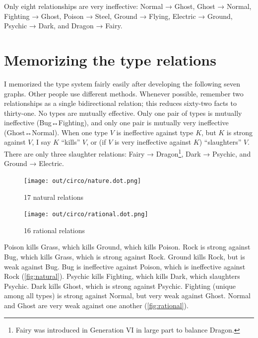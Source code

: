Only eight relationships are very ineffective:
Normal → Ghost,
Ghost → Normal,
Fighting → Ghost,
Poison → Steel,
Ground → Flying,
Electric → Ground,
Psychic → Dark,
and Dragon → Fairy.

\section{Memorizing the type relations}
I memorized the type system fairly easily after developing the following seven graphs.
Other people use different methods.
Whenever possible, remember two relationships as a single bidirectional relation;
  this reduces sixty-two facts to thirty-one.
No types are mutually effective.
Only one pair of types is mutually ineffective (Bug↔Fighting),
  and only one pair is mutually very ineffective (Ghost↔Normal).
When one type $V$ is ineffective against type $K$, but $K$ is strong
 against $V$, I say $K$ ``kills'' $V$, or
 (if $V$ is very ineffective against $K$) ``slaughters'' $V$.
There are only three slaughter relations: Fairy → Dragon\footnote{Fairy was
  introduced in Generation VI in large part to balance Dragon.}, Dark → Psychic,
  and Ground → Electric.

\begin{figure}[h!]
  \begin{minipage}[t]{0.5\textwidth}
    \begin{center}
    \texttt{[image: out/circo/nature.dot.png]}
    \end{center}
    \caption{17 natural relations\label{fig:natural}}
  \end{minipage}
  \begin{minipage}[t]{0.5\textwidth}
    \begin{center}
    \texttt{[image: out/circo/rational.dot.png]}
    \end{center}
    \caption{16 rational relations\label{fig:rational}}
  \end{minipage}
\end{figure}
\noindent{}Poison kills Grass, which kills Ground, which kills Poison.
Rock is strong against Bug, which kills Grass, which is strong against Rock.
Ground kills Rock, but is weak against Bug.
Bug is ineffective against Poison, which is ineffective against Rock (\autoref{fig:natural}).
Psychic kills Fighting, which kills Dark, which slaughters Psychic.
Dark kills Ghost, which is strong against Psychic.
Fighting (unique among all types) is strong against Normal,
  but very weak against Ghost.
Normal and Ghost are very weak against one another (\autoref{fig:rational}).

